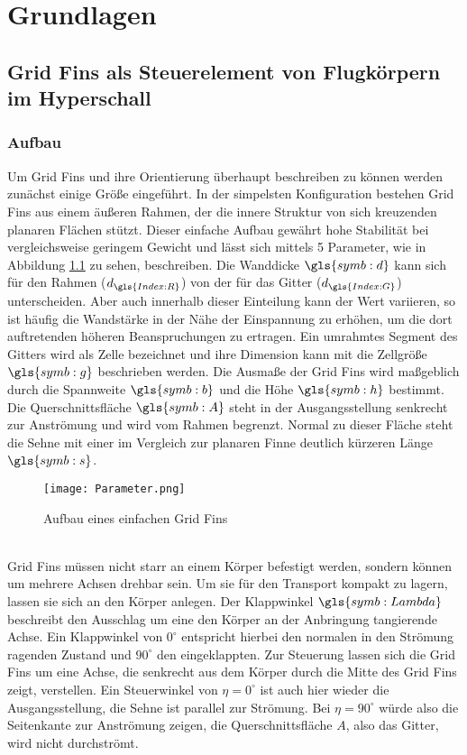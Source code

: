 \chapter{Grundlagen}
\label{sec:grundlagen}

\section{Grid Fins als Steuerelement von Flugkörpern im Hyperschall}
\subsection{Aufbau}
Um Grid Fins und ihre Orientierung überhaupt beschreiben zu können werden zunächst einige Größe eingeführt.
In der simpelsten Konfiguration bestehen Grid Fins aus einem äußeren Rahmen, der die innere Struktur von sich kreuzenden planaren Flächen stützt. Dieser einfache Aufbau gewährt hohe Stabilität bei vergleichsweise geringem Gewicht \cite{zellform} und lässt sich mittels 5 Parameter, wie in Abbildung \ref{abb_parameter} zu sehen, beschreiben. Die Wanddicke $\gls{symb:d}$ kann sich für den Rahmen ($d_{\gls{Index:R}}$) von der für das Gitter ($d_{\gls{Index:G}}$) unterscheiden. Aber auch innerhalb dieser Einteilung kann der Wert variieren, so ist häufig die Wandstärke in der Nähe der Einspannung zu erhöhen, um die dort auftretenden höheren Beanspruchungen zu ertragen. Ein umrahmtes Segment des Gitters wird als Zelle bezeichnet und ihre Dimension kann mit die Zellgröße $\gls{symb:g}$ beschrieben werden. Die Ausmaße der Grid Fins wird maßgeblich durch die Spannweite $\gls{symb:b}$ und die Höhe $\gls{symb:h}$ bestimmt. Die Querschnittsfläche $\gls{symb:A}$ steht in der Ausgangsstellung senkrecht zur Anströmung und wird vom Rahmen begrenzt. Normal zu dieser Fläche steht die Sehne mit einer im Vergleich zur planaren Finne deutlich kürzeren Länge $\gls{symb:s}$.\\
\begin{figure}[h]
	\centering
	\texttt{[image: Parameter.png]}
	\caption{Aufbau eines einfachen Grid Fins}
	\label{abb_parameter}
\end{figure}\\
Grid Fins müssen nicht starr an einem Körper befestigt werden, sondern können um mehrere Achsen drehbar sein. Um sie für den Transport kompakt zu lagern, lassen sie sich an den Körper anlegen. Der Klappwinkel $\gls{symb:Lambda}$ beschreibt den Ausschlag um eine den Körper an der Anbringung tangierende Achse. Ein Klappwinkel von $0^\circ$ entspricht hierbei den normalen in den Strömung ragenden Zustand und $90^\circ$ den eingeklappten. Zur Steuerung lassen sich die Grid Fins um eine Achse, die senkrecht aus dem Körper durch die Mitte des Grid Fins zeigt, verstellen. Ein Steuerwinkel von $\eta = 0^\circ$ ist auch hier wieder die Ausgangsstellung, die Sehne ist parallel zur Strömung. Bei $\eta = 90^\circ$ würde also die Seitenkante zur Anströmung zeigen, die Querschnittsfläche $A$, also das Gitter, wird nicht durchströmt.
